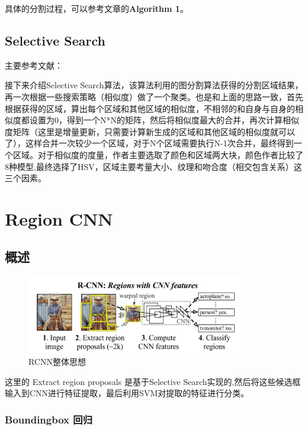 具体的分割过程，可以参考文章\cite{Felzenszwalb2004}的\textbf{Algorithm 1}。

\subsection{Selective Search}
主要参考文献：\cite{Uijlings2013}

接下来介绍Selective Search算法，该算法利用\cite{Felzenszwalb2004}的图分割算法获得的分割区域结果，再一次根据一些搜索策略（相似度）做了一个聚类。也是和上面的思路一致，首先根据获得的区域，算出每个区域和其他区域的相似度，不相邻的和自身与自身的相似度都设置为0，得到一个N*N的矩阵，然后将相似度最大的合并，再次计算相似度矩阵（这里是增量更新，只需要计算新生成的区域和其他区域的相似度就可以了），这样合并一次较少一个区域，对于N个区域需要执行N-1次合并，最终得到一个区域。对于相似度的度量，作者主要选取了颜色和区域两大块，颜色作者比较了8种模型,最终选择了HSV，区域主要考量大小、纹理和吻合度（相交包含关系）这三个因素。





\section{Region CNN}

\subsection{概述}

\begin{figure}[!htbp] 
\centering
\includegraphics[width=0.85\textwidth]{FeatureExtraction/RCNN0.jpg}
\caption{RCNN整体思想 }
\label{RCNN0}
\end{figure}

这里的 Extract region proposals 是基于Selective Search实现的,然后将这些候选框输入到CNN进行特征提取，最后利用SVM对提取的特征进行分类。


\subsubsection{Boundingbox 回归}




